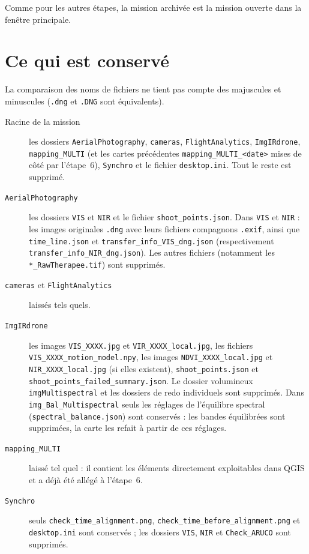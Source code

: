 \documentclass[a4paper,11pt]{report}
\begin{document}
Comme pour les autres étapes, la mission archivée est la mission ouverte dans la fenêtre principale.

\section{Ce qui est conservé}\label{btn:step7_rules}
La comparaison des noms de fichiers ne tient pas compte des majuscules et minuscules (\texttt{.dng} et \texttt{.DNG} sont équivalents).
\begin{description}
  \item[Racine de la mission] les dossiers \texttt{AerialPhotography}, \texttt{cameras}, \texttt{FlightAnalytics}, \texttt{ImgIRdrone}, \texttt{mapping\_MULTI} (et les cartes précédentes \texttt{mapping\_MULTI\_<date>} mises de côté par l'étape~6), \texttt{Synchro}
        et le fichier \texttt{desktop.ini}. Tout le reste est supprimé.
  \item[\texttt{AerialPhotography}] les dossiers \texttt{VIS} et \texttt{NIR} et le fichier \texttt{shoot\_points.json}. Dans \texttt{VIS} et \texttt{NIR} : les images originales
        \texttt{.dng} avec leurs fichiers compagnons \texttt{.exif}, ainsi que \texttt{time\_line.json} et \texttt{transfer\_info\_VIS\_dng.json} (respectivement \texttt{transfer\_info\_NIR\_dng.json}).
        Les autres fichiers (notamment les \texttt{*\_RawTherapee.tif}) sont supprimés.
  \item[\texttt{cameras} et \texttt{FlightAnalytics}] laissés tels quels.
  \item[\texttt{ImgIRdrone}] les images \texttt{VIS\_XXXX.jpg} et \texttt{VIR\_XXXX\_local.jpg}, les fichiers \texttt{VIS\_XXXX\_motion\_model.npy}, les images
        \texttt{NDVI\_XXXX\_local.jpg} et \texttt{NIR\_XXXX\_local.jpg} (si elles existent), \texttt{shoot\_points.json} et \texttt{shoot\_points\_failed\_summary.json}.
        Le dossier volumineux \texttt{imgMultispectral} et les dossiers de \og redo \fg{} individuels sont supprimés. Dans \texttt{img\_Bal\_Multispectral} seuls les réglages de l'équilibre spectral (\texttt{spectral\_balance.json}) sont conservés : les bandes équilibrées sont supprimées, la carte les refait à partir de ces réglages.
  \item[\texttt{mapping\_MULTI}] laissé tel quel : il contient les éléments directement exploitables dans QGIS et a déjà été allégé à l'étape~6.
  \item[\texttt{Synchro}] seuls \texttt{check\_time\_alignment.png}, \texttt{check\_time\_before\_alignment.png} et \texttt{desktop.ini} sont conservés ; les dossiers \texttt{VIS}, \texttt{NIR} et \texttt{Check\_ARUCO} sont supprimés.
\end{description}
\end{document}
